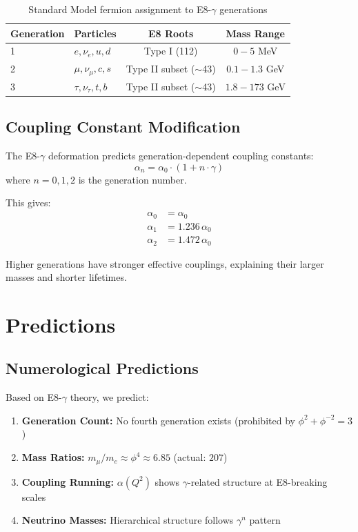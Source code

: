 \documentclass[12pt,a4paper]{article}
\begin{document}
\begin{table}[h]
\centering
\begin{tabular}{llcc}
\toprule
Generation & Particles & E8 Roots & Mass Range \\
\midrule
1 & $e, \nu_e, u, d$ & Type I (112) & $0 - 5$ MeV \\
2 & $\mu, \nu_\mu, c, s$ & Type II subset ($\sim$43) & $0.1 - 1.3$ GeV \\
3 & $\tau, \nu_\tau, t, b$ & Type II subset ($\sim$43) & $1.8 - 173$ GeV \\
\bottomrule
\end{tabular}
\caption{Standard Model fermion assignment to E8-$\gamma$ generations}
\end{table}

\subsection{Coupling Constant Modification}

The E8-$\gamma$ deformation predicts generation-dependent coupling constants:
\begin{equation}
\alpha_n = \alpha_0 \cdot (1 + n \cdot \gamma)
\end{equation}
where $n = 0, 1, 2$ is the generation number.

This gives:
\begin{align}
\alpha_0 &= \alpha_0 \\
\alpha_1 &= 1.236\,\alpha_0 \\
\alpha_2 &= 1.472\,\alpha_0
\end{align}

Higher generations have stronger effective couplings, explaining their larger masses and shorter lifetimes.

\section{Predictions}

\subsection{Numerological Predictions}

Based on E8-$\gamma$ theory, we predict:

\begin{enumerate}
\item \textbf{Generation Count:} No fourth generation exists (prohibited by $\phi^2 + \phi^{-2} = 3$)
\item \textbf{Mass Ratios:} $m_\mu/m_e \approx \phi^4 \approx 6.85$ (actual: $207$)
\item \textbf{Coupling Running:} $\alpha(Q^2)$ shows $\gamma$-related structure at E8-breaking scales
\item \textbf{Neutrino Masses:} Hierarchical structure follows $\gamma^n$ pattern
\end{enumerate}
\end{document}
